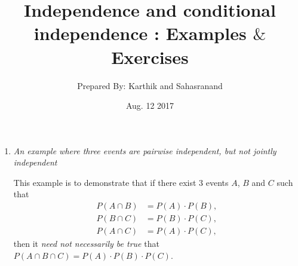 \documentclass[12pt]{article}
\title {\sc Independence and conditional independence : Examples $\&$ Exercises}
\date{Aug. 12 2017}
\author{Prepared By: Karthik and Sahasranand}
\begin{document}
\maketitle 
\pagestyle{fancy}

\begin{enumerate}
\item \emph{An example where three events are pairwise independent, but not jointly independent}\\
	
\par This example is to demonstrate that if there exist $3$ events $A$, $B$ and $C$ such that
\begin{align}
P(A\cap B)&=P(A)\cdot P(B),\nonumber\\
P(B\cap C)&=P(B)\cdot P(C),\nonumber\\
P(A\cap C)&=P(A)\cdot P(C),\nonumber
\end{align}
then it \emph{need not necessarily be true} that $P(A\cap B\cap C)=P(A)\cdot P(B)\cdot P(C)$.


\end{enumerate}
\end{document}
